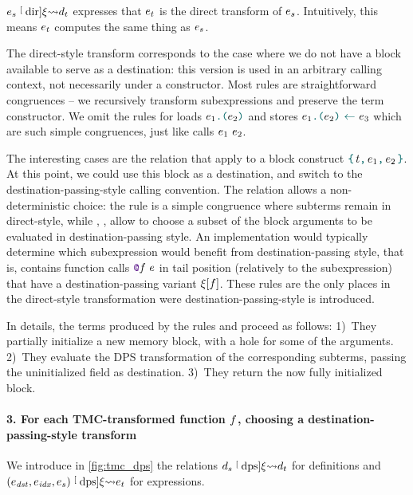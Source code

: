 $\datalangExpr_s \tmcDir{\datalangRenaming} \datalangDef_t$ expresses that $\datalangExpr_t$ is the direct transform of $\datalangExpr_s$.
Intuitively, this means $\datalangExpr_t$ computes the same thing as $\datalangExpr_s$.

The direct-style transform corresponds to the case where we do not have a block available to serve as a destination: this version is used in an arbitrary calling context, not necessarily under a constructor. Most rules are straightforward congruences -- we recursively transform subexpressions and preserve the term constructor. We omit the rules for loads $\datalangLoad{\datalangExpr_1}{\datalangExpr_2}$ and stores $\datalangStore{\datalangExpr_1}{\datalangExpr_2}{\datalangExpr_3}$ which are such simple congruences, just like calls $\datalangCall {\datalangExpr_1} {\datalangExpr_2}$. 

The interesting cases are the relation that apply to a block construct $\datalangBlock \datalangTag {\datalangExpr_1} {\datalangExpr_2}$. At this point, we could use this block as a destination, and switch to the destination-passing-style calling convention. The relation allows a non-deterministic choice: the rule  is a simple congruence where subterms remain in direct-style, while , ,  allow to choose a subset of the block arguments to be evaluated in destination-passing style. An implementation would typically determine which subexpression would benefit from destination-passing style, that is, contains function calls $\datalangCall {\datalangFnptr \datalangFn} \datalangExpr$ in tail position (relatively to the subexpression) that have a destination-passing variant $\datalangRenaming [\datalangFn]$. These rules are the only places in the direct-style transformation were destination-passing-style is introduced.

In details, the terms produced by the rules  and  proceed as follows:
1)~They partially initialize a new memory block, with a hole for some of the arguments.
2)~They evaluate the DPS transformation of the corresponding subterms, passing the uninitialized field as destination.
3)~They return the now fully initialized block.

\paragraph{3. For each TMC-transformed function $\datalangFn$, choosing a destination-passing-style transform}
We introduce in \cref{fig:tmc_dps} the relations $\datalangDef_s \tmcDps{\datalangRenaming} \datalangDef_t$ for definitions and $(\datalangExpr_\mathit{dst}, \datalangExpr_\mathit{idx}, \datalangExpr_s) \tmcDps{\datalangRenaming} \datalangExpr_t$ for expressions.


